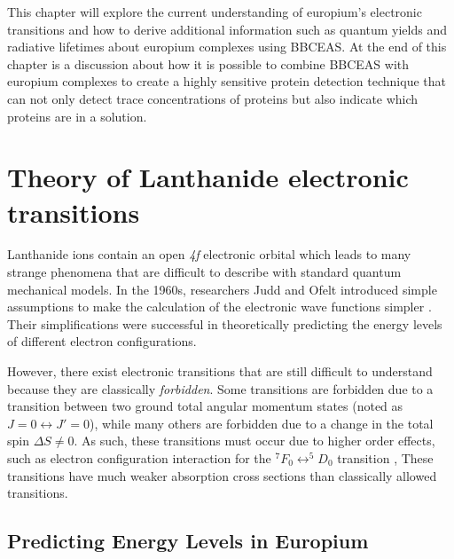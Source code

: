 This chapter will explore the current understanding of europium's electronic
transitions and how to derive additional information such as quantum yields
and radiative lifetimes about europium complexes using \ac{BBCEAS}. At the
end of this chapter is a discussion about how it is possible to combine
\ac{BBCEAS} with europium complexes to create a highly sensitive protein
detection technique that can not only detect trace concentrations of proteins
but also indicate which proteins are in a solution.



\section{Theory of Lanthanide electronic transitions}\label{sec:theory_eu}

Lanthanide ions contain an open \textsl{4f} electronic orbital which leads to
many strange phenomena that are difficult to describe with standard quantum
mechanical models\cite{Wybourne:1968ez}. In the 1960s, researchers Judd and
Ofelt introduced simple assumptions to make the calculation of the electronic
wave functions simpler \cite{Judd:1962uq,Ofelt:1962kd}. Their simplifications
were successful in theoretically predicting the energy levels of different
electron configurations.

However, there exist electronic transitions that are still difficult to
understand because they are classically \emph{forbidden}. Some transitions are
forbidden due to a transition between two ground total angular momentum states
(noted as $ J=0 \leftrightarrow J'=0 $), while many others are forbidden due to
a change in the total spin $\Delta S \neq 0$. As such, these transitions must
occur due to higher order effects, such as electron configuration interaction
for the $^7F_0 \leftrightarrow ^5D_0$ transition \cite{Jankowski:1981es}, These
transitions have much weaker absorption cross sections than classically allowed
transitions.



\subsection{Predicting Energy Levels in Europium}\label{subsec:predict_eu}

